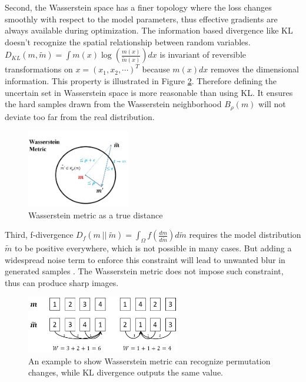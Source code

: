 \documentclass{article}
\begin{document}
Second, the Wasserstein space has a finer topology where the loss changes smoothly with respect to the model parameters, thus effective gradients are always available during optimization. The information based divergence like KL doesn't recognize the spatial relationship between random variables. $D_{KL}(m,\tilde{m}) = \int m(x)\log(\frac{m(x)}{\tilde{m}(x)}) dx$ is invariant of reversible transformations on $x = (x_1, x_2, \cdots)^T$ because $m(x)dx$ removes the dimensional information. This property is illustrated in Figure \ref{fig:w6}. Therefore defining the uncertain set in Wasserstein space is more reasonable than using KL. It ensures the hard samples drawn from the Wasserstein neighborhood $B_\rho(m)$ will not deviate too far from the real distribution.

\begin{figure}[htb!]
\centering
\includegraphics[width=0.4\textwidth]{FIGDRG/w5}
\caption{Wasserstein metric as a true distance}
\label{fig:Wasserstein}
\end{figure}

Third, f-divergence $D_f(m\ || \ \tilde{m}) = \int_{\Omega} f(\frac{dm}{d\tilde{m}}) d\tilde{m}$ requires the model distribution $\tilde{m}$ to be positive everywhere, which is not possible in many cases. But adding a widespread noise term to enforce this constraint will lead to unwanted blur in generated samples \cite{DBLP:journals/corr/WuBSG16}. The Wasserstein metric does not impose such constraint, thus can produce sharp images.

\begin{figure}[htb!]
\centering
\includegraphics[width=0.6\textwidth]{FIGDRG/w6}
\caption{An example to show Wasserstein metric can recognize permutation changes, while KL divergence outputs the same value. }
\label{fig:w6}
\end{figure}
\end{document}
